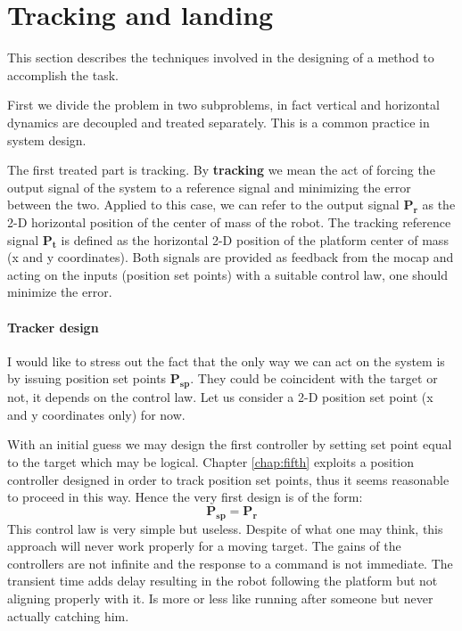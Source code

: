 \section{Tracking and landing}
This section describes the techniques involved in the designing of a method to accomplish the task.

First we divide the problem in two subproblems, in fact vertical and horizontal dynamics are decoupled and treated separately. This is a common practice in system design. 

The first treated part is tracking. By \textbf{tracking} we mean the act of forcing the output signal of the system to a reference signal and minimizing the error between the two. Applied to this case, we can refer to the output signal $\boldsymbol{P_r}$ as the 2-D horizontal position of the center of mass of the robot. The tracking reference signal 
$\boldsymbol{P_t}$ is defined as the horizontal 2-D position  of the platform center of mass (x and y coordinates). Both signals are provided as feedback from the mocap and acting on the inputs (position set points) with a suitable control law, one should minimize the error.

\paragraph{Tracker design} I would like to stress out the fact that the only way we can act on the system is by issuing position set points $\boldsymbol{P_{sp}}$. They could be coincident with the target or not, it depends on the control law. Let us consider a 2-D position set point  (x and y coordinates only) for now.

With an initial guess we may design the first controller by setting set point equal to the target which may be logical. Chapter \ref{chap:fifth} exploits a position controller designed in order to track position set points, thus it seems reasonable to proceed in this way. Hence the very first design is of the form:
\begin{equation}
\boldsymbol{P_{sp }} = \boldsymbol{P_{r}}
\label{eq:contr1}
\end{equation}
This control law is very simple but useless. Despite of what one may think, this approach will never work properly for a moving target. The gains of the controllers are not infinite and the response to a command is not immediate. The transient time adds delay resulting in the robot following the platform but not aligning properly with it. Is more or less like running after someone but never actually catching him.

